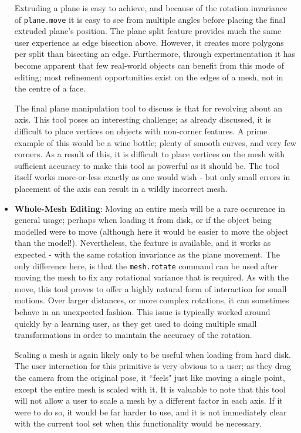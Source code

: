 \documentclass[a4paper,10pt]{report}
\begin{document}
\begin{itemize}
{Extruding a plane is easy to achieve, and because of the rotation invariance of \texttt{plane.move} it is easy to see from multiple angles before placing the final extruded plane's position. The plane split feature provides much the same user experience as edge bisection above. However, it creates more polygons per split than bisecting an edge. Furthermore, through experimentation it has become apparent that few real-world objects can benefit from this mode of editing; most refinement opportunities exist on the edges of a mesh, not in the centre of a face.

The final plane manipulation tool to discuss is that for revolving about an axis. This tool poses an interesting challenge; as already discussed, it is difficult to place vertices on objects with non-corner features. A prime example of this would be a wine bottle; plenty of smooth curves, and very few corners. As a result of this, it is difficult to place vertices on the mesh with sufficient accuracy to make this tool as powerful as it should be. The tool itself works more-or-less exactly as one would wish - but only small errors in placement of the axis can result in a wildly incorrect mesh. 

}

\item{\textbf{Whole-Mesh Editing}: Moving an entire mesh will be a rare occurence in general usage; perhaps when loading it from disk, or if the object being modelled were to move (although here it would be easier to move the object than the model!). Nevertheless, the feature is available, and it works as expected - with the same rotation invariance as the plane movement. The only difference here, is that the \texttt{mesh.rotate} command can be used after moving the mesh to fix any rotational variance that is required. As with the move, this tool proves to offer a highly natural form of interaction for small motions. Over larger distances, or more complex rotations, it can sometimes behave in an unexpected fashion. This issue is typically worked around quickly by a learning user, as they get used to doing multiple small transformations in order to maintain the accuracy of the rotation.

Scaling a mesh is again likely only to be useful when loading from hard disk. The user interaction for this primitive is very obvious to a user; as they drag the camera from the original pose, it ``feels" just like moving a single point, except the entire mesh is scaled with it. It is valuable to note that this tool will not allow a user to scale a mesh by a different factor in each axis. If it were to do so, it would be far harder to use, and it is not immediately clear with the current tool set when this functionality would be necessary.

}
\end{itemize}
\end{document}
